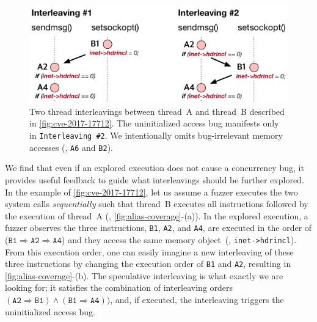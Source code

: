 \begin{figure}[t]
  \centering
  \includegraphics[width=0.8\linewidth]{fig/alias-coverage.pdf}
  \caption{Two thread interleavings between thread~A and thread~B
    described in \autoref{fig:cve-2017-17712}.
    The uninitialized access bug manifests only in
    \texttt{Interleaving \#2}.
    We intentionally omits bug-irrelevant memory accesses (\ie,
    \texttt{A6} and \texttt{B2}).}
  \label{fig:alias-coverage}
\end{figure}


%
We find that even if an explored execution does not cause a
concurrency bug, it provides useful feedback to guide what
interleavings should be further explored.
%
In the example of \autoref{fig:cve-2017-17712}, let us assume a fuzzer
executes the two system calls \textit{sequentially} such that thread~B
executes all instructions followed by the execution of thread~A (\ie,
\autoref{fig:alias-coverage}-(a)).  In the explored execution, a
fuzzer observes the three instructions, \texttt{B1}, \texttt{A2}, and
\texttt{A4}, are executed in the order of
($\texttt{B1} \Rightarrow \texttt{A2} \Rightarrow \texttt{A4}$) and
they access the same memory object~(\ie, \texttt{inet->hdrincl}).
%
From this execution order, one can easily imagine a new interleaving
of these three instructions by changing the execution order of
\texttt{B1} and \texttt{A2}, resulting in
\autoref{fig:alias-coverage}-(b).
%
The speculative interleaving is what exactly we are looking for; it
satisfies the combination of interleaving orders
$(\texttt{A2} \Rightarrow \texttt{B1}) \wedge (\texttt{B1} \Rightarrow
\texttt{A4}))$, and, if executed, the interleaving triggers the
uninitialized access bug.

